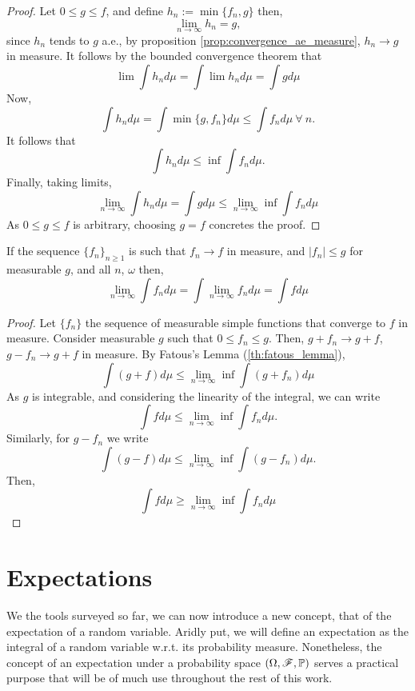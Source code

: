\documentclass[../TGMAFFIRO.tex]{subfiles}
\begin{document}
\begin{proof}
	Let $0 \leq g \leq f$, and define $h_n:= \min\{f_n, g\}$ then,
	\[
		\lim_{n\to\infty} h_n = g,
	\]
	since $h_n$ tends to $g$ a.e., by proposition \ref{prop:convergence_ae_measure}, $h_n \to g$ in measure. It follows by the bounded convergence theorem that
	\begin{equation}
		\lim \int h_n d\mu = \int \lim h_n d\mu = \int g d\mu
	\end{equation}
	Now, 
	\[
		\int h_n d\mu = \int \min\{g, f_n\} d\mu \leq \int f_n d	\mu \ \forall \ n.
	\]
	It follows that
	\[
		\int h_n d\mu \leq \inf\int f_n d\mu.
	\]
	Finally, taking limits,
	\[
		\lim_{n\to\infty} \int h_n d\mu = \int g d\mu \leq \lim_{n\to\infty}\inf \int f_n d\mu
	\]
	As $0 \leq g \leq f$ is arbitrary, choosing $g = f$ concretes the proof.
\end{proof}

\begin{theorem}
If the sequence $\{f_n\}_{n\geq 1}$ is such that $f_n \to f$ in measure, and $|f_n| \leq g$ for measurable $g$, and all $n$, $\omega$ then,
\begin{equation}
	\lim_{n\to\infty}\int f_n d\mu = \int \lim_{n\to\infty} f_n d\mu  = \int f d\mu
\end{equation}
\end{theorem}

\begin{proof}
	Let $\{f_n\}$ the sequence of measurable simple functions that converge to $f$ in measure. Consider measurable $g$ such that $0 \leq f_n \leq g$. Then, $g + f_n \to g + f$, $g - f_n \to g + f$ in measure. By Fatous's Lemma (\ref	{th:fatous_lemma}),
	\[
		\int(g + f) d\mu \leq \lim_{n\to\infty}\inf\int(g + f_n) d\mu
	\]	
	As $g$ is integrable, and considering the linearity of the integral, we can write
	\[
		\int f d\mu \leq \lim_{n\to\infty}\inf\int f_n d\mu.
	\]
	Similarly, for $g - f_n$ we write
	\[
		\int(g - f) d\mu \leq \lim_{n\to\infty} \inf \int (g - f_n) d\mu.
	\]
	Then,
	\[
		\int f d\mu \geq \lim_{n\to\infty} \inf \int f_n d\mu
	\]
\end{proof}

\section{Expectations}
We the tools surveyed so far, we can now introduce a new concept, that of the expectation of a random variable. Aridly put, we will define an expectation as the integral of a random variable w.r.t. its probability measure. Nonetheless, the concept of an expectation under a probability space $(\Omega, \mathscr{F}, \mathbb{P})$ serves a practical purpose that will be of much use throughout the rest of this work.
\end{document}
